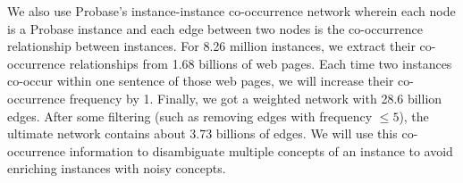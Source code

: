 We also use Probase's instance-instance co-occurrence network wherein each
node is a Probase instance and each edge between two nodes is the
co-occurrence relationship between instances.  For 8.26 million
instances, we extract their co-occurrence relationships from 1.68
billions of web pages.  Each time two instances co-occur within one
sentence of those web pages, we will increase their co-occurrence
frequency by 1.  Finally, we got a weighted network with 28.6 billion
edges.  After some filtering (such as removing edges with frequency
$\leq 5$), the ultimate network contains about 3.73 billions of edges.
We will use this co-occurrence information to disambiguate multiple
concepts of an instance to avoid enriching instances with noisy concepts.
%
%
%


